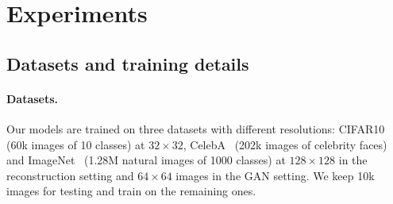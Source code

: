 \documentclass[10pt,twocolumn,letterpaper]{article}
\begin{document}
\section{Experiments}

\subsection{Datasets and training details}

\paragraph{Datasets.}

Our models are trained on three datasets with different resolutions: CIFAR10~\cite{Krizhevsky2010cifar10} (60k images of 10 classes) at $32\times 32$, CelebA~\cite{celebA} (202k images of celebrity faces) and ImageNet~\cite{imagenet_cvpr09} (1.28M natural images of 1000 classes) at $128\times128$ in the reconstruction setting and $64\times 64$ images in the GAN setting. We keep 10k images for testing and train on the remaining ones.
\end{document}
